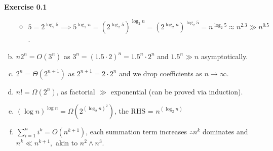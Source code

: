 \documentclass{article}
\newenvironment{problem}[2][Exercise]
    { \begin{mdframed}[backgroundcolor=gray!20] \textbf{#1 #2} \\}
    {  \end{mdframed}}
\begin{document}
\begin{problem}{0.1}
\begin{enumerate}[(a)]
        \begin{itemize}
            \item $5=2^{\log_2 5}\implies5^{\log_2 n}
                =(2^{\log_2 5})^{\log_2 n}
                =(2^{\log_2 n})^{\log_2 5}
                =n^{\log_2 5}\approx n^{2.3}\gg n^{0.5}$.
        \end{itemize}
    \item $n2^n=O(3^n)$ as $3^n = (1.5 \cdot 2)^n = 1.5^n \cdot 2^n$ and $1.5^n \gg n$ asymptotically.
    \item $2^n=\Theta(2^{n+1})$ as $2^{n+1}=2\cdot2^{n}$ and we drop coefficients as $n\to\infty$.
    \item $n!=\Omega(2^n)$, as factorial $\gg$ exponential (can be proved via induction).
    \item $(\log n)^{\log n}=\Omega(2^{{(\log_2 n)}^2})$, the RHS = $n^{(\log_2 n)}$
    \item $\displaystyle\sum_{i=1}^n i^k = O(n^{k+1})$, each summation term increases $\therefore n^k$ dominates and $n^k\ll n^{k+1},$ akin to $n^2\land n^3$.
\end{enumerate}
\end{problem}
\end{document}
